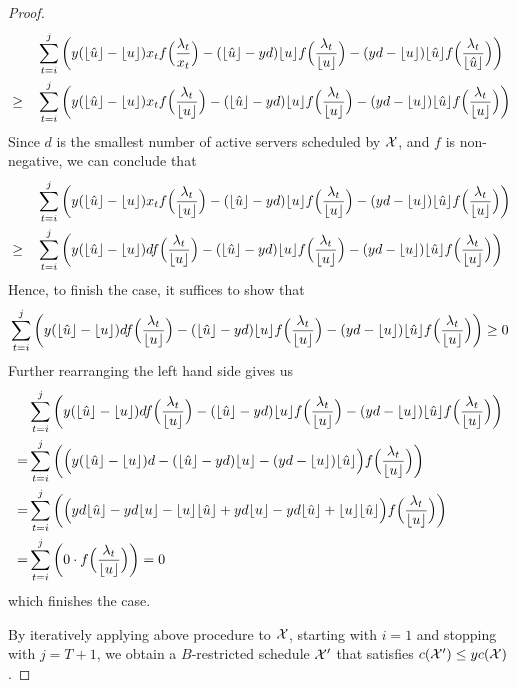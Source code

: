\begin{proof}
\begin{align*}
	&&&\sum\limits_{t=i}^j\left(y(\lfloor\hat{u}\rfloor-\lfloor u\rfloor)x_tf\Bigl(\frac{\lambda_t}{x_t}\Bigr)-(\lfloor\hat{u}\rfloor-yd)\lfloor u\rfloor f\Bigl(\frac{\lambda_t}{\lfloor u\rfloor}\Bigr)-(yd-\lfloor u\rfloor)\lfloor\hat{u}\rfloor f\Bigl(\frac{\lambda_t}{\lfloor\hat{u}\rfloor}\Bigr)\right)\\
	&\ge&&\sum\limits_{t=i}^j\left(y(\lfloor\hat{u}\rfloor-\lfloor u\rfloor)x_tf\Bigl(\frac{\lambda_t}{\lfloor u\rfloor}\Bigr)-(\lfloor\hat{u}\rfloor-yd)\lfloor u\rfloor f\Bigl(\frac{\lambda_t}{\lfloor u\rfloor}\Bigr)-(yd-\lfloor u\rfloor)\lfloor\hat{u}\rfloor f\Bigl(\frac{\lambda_t}{\lfloor u\rfloor}\Bigr)\right)
\end{align*}
Since $d$ is the smallest number of active servers scheduled by $\mathcal{X}$, and $f$ is non-negative, we can conclude that
\begin{align*}
	&&&\sum\limits_{t=i}^j\left(y(\lfloor\hat{u}\rfloor-\lfloor u\rfloor)x_tf\Bigl(\frac{\lambda_t}{\lfloor u\rfloor}\Bigr)-(\lfloor\hat{u}\rfloor-yd)\lfloor u\rfloor f\Bigl(\frac{\lambda_t}{\lfloor u\rfloor}\Bigr)-(yd-\lfloor u\rfloor)\lfloor\hat{u}\rfloor f\Bigl(\frac{\lambda_t}{\lfloor u\rfloor}\Bigr)\right)\\
	&\ge&&\sum\limits_{t=i}^j\left(y(\lfloor\hat{u}\rfloor-\lfloor u\rfloor)df\Bigl(\frac{\lambda_t}{\lfloor u\rfloor}\Bigr)-(\lfloor\hat{u}\rfloor-yd)\lfloor u\rfloor f\Bigl(\frac{\lambda_t}{\lfloor u\rfloor}\Bigr)-(yd-\lfloor u\rfloor)\lfloor\hat{u}\rfloor f\Bigl(\frac{\lambda_t}{\lfloor u\rfloor}\Bigr)\right)
\end{align*}
Hence, to finish the case, it suffices to show that
\begin{align*}
	\sum\limits_{t=i}^j\left(y(\lfloor\hat{u}\rfloor-\lfloor u\rfloor)df\Bigl(\frac{\lambda_t}{\lfloor u\rfloor}\Bigr)-(\lfloor\hat{u}\rfloor-yd)\lfloor u\rfloor f\Bigl(\frac{\lambda_t}{\lfloor u\rfloor}\Bigr)-(yd-\lfloor u\rfloor)\lfloor\hat{u}\rfloor f\Bigl(\frac{\lambda_t}{\lfloor u\rfloor}\Bigr)\right)\ge 0
\end{align*}
Further rearranging the left hand side gives us
\begin{align*}
	&\sum\limits_{t=i}^j\left(y(\lfloor\hat{u}\rfloor-\lfloor u\rfloor)df\Bigl(\frac{\lambda_t}{\lfloor u\rfloor}\Bigr)-(\lfloor\hat{u}\rfloor-yd)\lfloor u\rfloor f\Bigl(\frac{\lambda_t}{\lfloor u\rfloor}\Bigr)-(yd-\lfloor u\rfloor)\lfloor\hat{u}\rfloor f\Bigl(\frac{\lambda_t}{\lfloor u\rfloor}\Bigr)\right)\\
	=&\sum\limits_{t=i}^j\left(\Bigl(y(\lfloor\hat{u}\rfloor-\lfloor u\rfloor)d-(\lfloor\hat{u}\rfloor-yd)\lfloor u\rfloor-(yd-\lfloor u\rfloor)\lfloor\hat{u}\rfloor\Bigr)f\Bigl(\frac{\lambda_t}{\lfloor u\rfloor}\Bigr)\right)\\
	=&\sum\limits_{t=i}^j\left(\Bigl(yd\lfloor\hat{u}\rfloor-yd\lfloor u\rfloor-\lfloor u\rfloor\lfloor\hat{u}\rfloor+yd\lfloor u\rfloor-yd\lfloor\hat{u}\rfloor+\lfloor u\rfloor\lfloor\hat{u}\rfloor\Bigr)f\Bigl(\frac{\lambda_t}{\lfloor u\rfloor}\Bigr)\right)\\
	=&\sum\limits_{t=i}^j\left(0\cdot f\Bigl(\frac{\lambda_t}{\lfloor u\rfloor}\Bigr)\right)=0
\end{align*}
which finishes the case.

By iteratively applying above procedure to $\mathcal{X}$, starting with $i=1$ and stopping with $j=T+1$, we obtain a $B$-restricted schedule $\mathcal{X}'$ that satisfies $c(\mathcal{X}')\le yc(\mathcal{X})$.
\end{proof}


